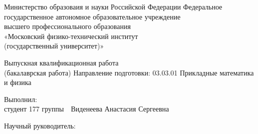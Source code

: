 \thispagestyle{empty}

\begin{center}
{\fontsize{14}{14}\selectfont
Министерство образоваия и науки Российской Федерации
}
{\fontsize{12}{12}\selectfont \wl}
{\fontsize{14}{14}\selectfont
Федеральное государственное автономное образовательное учреждение \\
высшего профессионального образования\\
«Московский физико-технический институт\\
(государственный университет)»
}		
{\fontsize{12}{12}\selectfont \wl}
{\fontsize{14}{14}\selectfont \departmentName }
{\fontsize{12}{12}\selectfont \wl}
{\fontsize{14}{14}\selectfont \chairName }
{\fontsize{12}{12}\selectfont \wl\wl\wl\wl}

{\fontsize{16}{19.2}\selectfont
	{\bf \thesisTitle }
}
{\fontsize{12}{12}\selectfont \wl}
{\fontsize{14}{14}\selectfont
Выпускная квалификационная работа\\
(бакалаврская работа)
}
{\fontsize{12}{12}\selectfont \wl}
{\fontsize{14}{16.8}\selectfont
Направление подготовки: 03.03.01 Прикладные математика и физика
}
{\fontsize{12}{12}\selectfont \wl\wl\wl}
\end{center}

{\fontsize{14}{14}\selectfont
\noindent Выполнил:\\ студент 177 группы\ \hrulefill\  Виденеева Анастасия Сергеевна
}

{\fontsize{12}{12}\selectfont \wl}

{\fontsize{14}{14}\selectfont
\noindent Научный руководитель:\\
\supervisorRegalia\ \hrulefill \ \supervisorFio
}
{\fontsize{12}{12}\selectfont \wl\wl\wl\wl\wl\wl\wl\wl\wl}
\begin{center}
{\thesisCity\ \thesisYear}
\end{center}

\newpage
